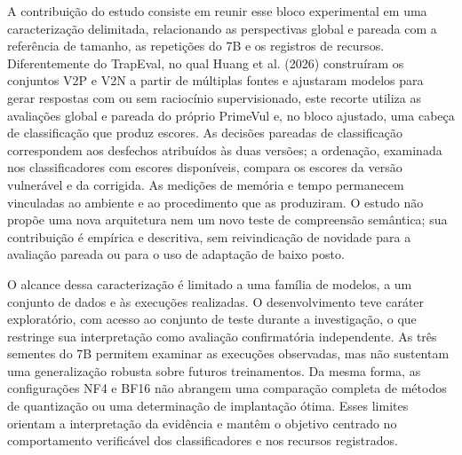 A contribuição do estudo consiste em reunir esse bloco experimental em uma caracterização delimitada, relacionando as perspectivas global e pareada com a referência de tamanho, as repetições do 7B e os registros de recursos. Diferentemente do TrapEval, no qual Huang et al. (2026) construíram os conjuntos V2P e V2N a partir de múltiplas fontes e ajustaram modelos para gerar respostas com ou sem raciocínio supervisionado, este recorte utiliza as avaliações global e pareada do próprio PrimeVul e, no bloco ajustado, uma cabeça de classificação que produz escores. As decisões pareadas de classificação correspondem aos desfechos atribuídos às duas versões; a ordenação, examinada nos classificadores com escores disponíveis, compara os escores da versão vulnerável e da corrigida. As medições de memória e tempo permanecem vinculadas ao ambiente e ao procedimento que as produziram. O estudo não propõe uma nova arquitetura nem um novo teste de compreensão semântica; sua contribuição é empírica e descritiva, sem reivindicação de novidade para a avaliação pareada ou para o uso de adaptação de baixo posto.

O alcance dessa caracterização é limitado a uma família de modelos, a um conjunto de dados e às execuções realizadas. O desenvolvimento teve caráter exploratório, com acesso ao conjunto de teste durante a investigação, o que restringe sua interpretação como avaliação confirmatória independente. As três sementes do 7B permitem examinar as execuções observadas, mas não sustentam uma generalização robusta sobre futuros treinamentos. Da mesma forma, as configurações NF4 e BF16 não abrangem uma comparação completa de métodos de quantização ou uma determinação de implantação ótima. Esses limites orientam a interpretação da evidência e mantêm o objetivo centrado no comportamento verificável dos classificadores e nos recursos registrados.

\nocite{ding2024primevul,risse2024limits,huang2026trap,hui2024qwen,hu2021lora,dettmers2023qlora}
